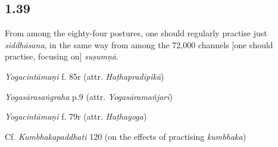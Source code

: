 \begin{ekdosis}
\begin{philcomm}[hp01_038]
\end{philcomm}

\subsection*{1.39}
\begin{translation}[hp01_039]
From among the eighty-four postures, one should regularly practise just \emph{siddhāsana}, in the same way from among the 72,000 channels [one should practise, focusing on] \emph{suṣumṇā}.
\end{translation}


\begin{testimonia}[hp01_039]
\emph{Yogacintāmaṇi} f. 85r (attr. \emph{Haṭhapradīpikā})

\begin{versinnote}
\end{versinnote}

\emph{Yogasārasaṅgraha} p.9 (attr. \emph{Yogasāramañjarī})

\begin{versinnote}
\end{versinnote}

\emph{Yogacintāmaṇi} f. 79r (attr. \emph{Haṭhayoga})

\begin{versinnote}
\end{versinnote}

Cf. \emph{Kumbhakapaddhati} 120 (on the effects of practising \emph{kumbhaka})

\begin{versinnote}
\end{versinnote}


\end{testimonia}
\end{ekdosis}
